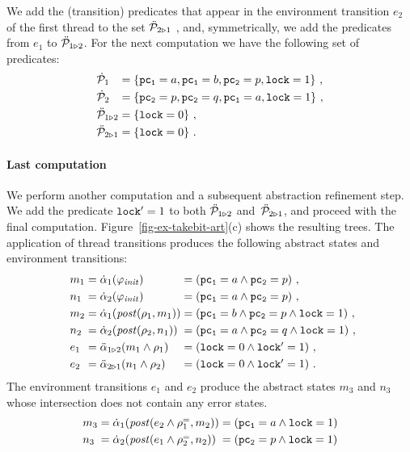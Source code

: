 We add the (transition) predicates that appear in the environment
transition $e_2$ of the first thread to the set $\ddot{\mathcal{P}}_{2\triangleright 1}\ $,
and, symmetrically, we add the predicates from $e_1$ to
$\ddot{\mathcal{P}}_{1\triangleright 2}$.
For the next \aret computation we have the following set of
predicates:
%
\begin{equation*}
  \begin{array}[t]{l@{\;=\;}l}
    \artPreds_1 & \set{\pcone=a, \pcone=b, \pctwo=p, \lock=1}\ ,\\[\jot]
    \artPreds_2 & \set{\pctwo=p, \pctwo=q, \pcone=a, \lock=1}\ ,\\[\jot]
    \artTPredsOf{1}{2} & \set{\lock=0}\ ,\\[\jot]
    \artTPredsOf{2}{1} & \set{\lock=0}\ .
  \end{array}
\end{equation*}
%


\paragraph{Last \aret computation}

We perform another \aret computation and a subsequent abstraction
refinement step.
We add the predicate $\mathtt{lock}'=1$ to both $\ddot{\mathcal{P}}_{1\triangleright 2}$
and~$\ddot{\mathcal{P}}_{2\triangleright 1}$, and proceed with the final \aret computation.
%
Figure~\ref{fig-ex-takebit-art}(c) shows the resulting trees.
The application of thread transitions produces the following abstract
states and environment transitions:
%
\begin{equation*}
  \begin{array}[t]{l@{\arrSpace}l@{\arrSpace}l@{}}
    m_1 & = \abst_1(\SymbInit) & = (\pcone = a \land \pctwo = p)\ ,  \\[\jot]
    n_1 & = \abst_2(\SymbInit) & = (\pcone = a \land \pctwo = p)\ , \\[\jot] 
    m_2 & = \abst_1(\post(\rel_1, m_1)) & = (\pcone = b \land \pctwo = p 
    \land \lock = 1)\ , \\[\jot] 
    n_2 & = \abst_2(\post(\rel_2, n_1)) & = (\pcone = a \land \pctwo = q 
    \land \lock = 1)\ , \\[\jot] 
    e_1 & = \abstTrans_{\envFromTo{1}{2}}(m_1 \land \rel_1) & = (\lock = 0 
    \land \lock'=1)\ , \\[\jot]
    e_2 & = \abstTrans_{\envFromTo{2}{1}}(n_1 \land \rel_2) & = (\lock = 0 
    \land \lock'=1)\ .
  \end{array}
\end{equation*}
%
The environment transitions $e_1$ and $e_2$ produce the abstract
states $m_3$ and $n_3$ whose intersection does not contain any error
states.
%
\begin{equation*}
  \begin{array}[t]{l@{\arrSpace}l@{\arrSpace}l}
    m_3 &= \abst_1(\post(e_2 \land \relLocEqOf{1}, m_2)) &= (\pcone = a 
    \land \lock = 1) \\[\jot] 
    n_3 &= \abst_2(\post(e_1 \land \relLocEqOf{2}, n_2)) &= (\pctwo = p 
    \land \lock = 1)
  \end{array}
\end{equation*}

